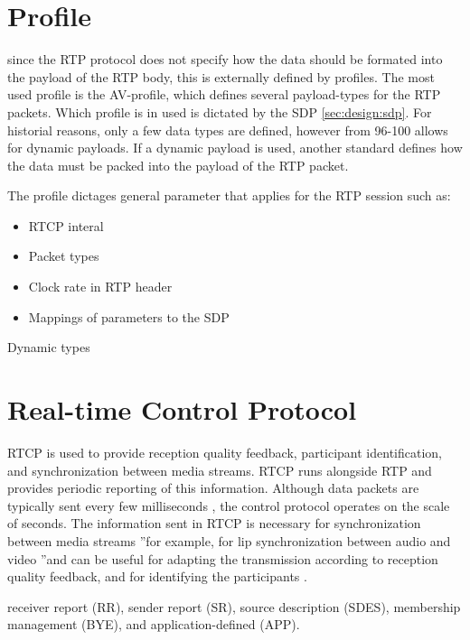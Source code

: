 \section{Profile}
since the RTP protocol does not specify how the data should be formated into the payload of the RTP body, this is externally defined by profiles. The most used profile is  the AV-profile, which defines several payload-types for the RTP packets. Which profile is in used is dictated by the SDP \ref{sec:design:sdp}. For historial reasons, only a few data types are defined, however from 96-100 allows for dynamic payloads. If a dynamic payload is used, another standard defines how the data must be packed into the payload of the RTP packet.

The profile dictages general parameter that applies for the RTP session such as:
\begin{itemize}
	\item RTCP interal
	\item Packet types
	\item Clock rate in RTP header
	\item Mappings of parameters to the SDP
\end{itemize}

Dynamic types

\cite{perkins2003rtp}
\section{Real-time Control Protocol}
RTCP is used to provide reception quality feedback, participant identification, and synchronization between media streams. RTCP runs alongside RTP and provides periodic reporting of this information. Although data packets are typically sent every few milliseconds , the control protocol operates on the scale of seconds. The information sent in RTCP is necessary for synchronization between media streams ”for example, for lip synchronization between audio and video ”and can be useful for adapting the transmission according to reception quality feedback, and for identifying the participants . 

receiver report (RR), sender report (SR), source description (SDES), membership management (BYE), and application-defined (APP). 

